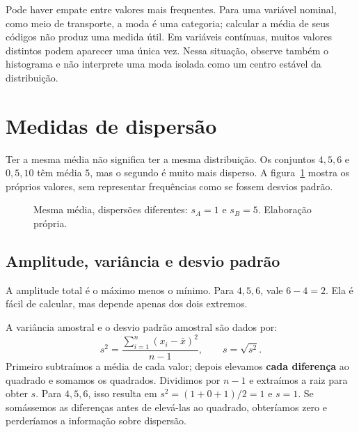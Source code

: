 Pode haver empate entre valores mais frequentes. Para uma variável nominal, como meio de transporte, a moda é uma categoria; calcular a média de seus códigos não produz uma medida útil. Em variáveis contínuas, muitos valores distintos podem aparecer uma única vez. Nessa situação, observe também o histograma e não interprete uma moda isolada como um centro estável da distribuição.

\section{Medidas de dispersão}

Ter a mesma média não significa ter a mesma distribuição. Os conjuntos $4,5,6$ e $0,5,10$ têm média $5$, mas o segundo é muito mais disperso. A figura~\ref{fig:dispersao-comparacao} mostra os próprios valores, sem representar frequências como se fossem desvios padrão.

\begin{figure}[H]
\centering
{}
\caption{Mesma média, dispersões diferentes: $s_A=1$ e $s_B=5$. Elaboração própria.}
\label{fig:dispersao-comparacao}
\end{figure}

\subsection{Amplitude, variância e desvio padrão}

A amplitude total é o máximo menos o mínimo. Para $4,5,6$, vale $6-4=2$. Ela é fácil de calcular, mas depende apenas dos dois extremos.

A variância amostral e o desvio padrão amostral são dados por:
\[
s^2=\frac{\sum_{i=1}^{n}(x_i-\bar{x})^2}{n-1},
\qquad s=\sqrt{s^2}.
\]
Primeiro subtraímos a média de cada valor; depois elevamos \textbf{cada diferença} ao quadrado e somamos os quadrados. Dividimos por $n-1$ e extraímos a raiz para obter $s$. Para $4,5,6$, isso resulta em $s^2=(1+0+1)/2=1$ e $s=1$. Se somássemos as diferenças antes de elevá-las ao quadrado, obteríamos zero e perderíamos a informação sobre dispersão.


